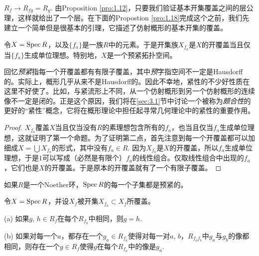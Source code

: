 $R_f\to R_{fg}=R_g$. 由Proposition \ref{pro:1.12}，只要我们验证基本开集覆盖之间的层公理，这样就给出了一个层。在下面的Propostion \ref{pro:1.18}完成这个之前，我们先建立一个简单但是很基本的引理，它描述了仿射概形的基本开集的覆盖。

\begin{lem}\label{lem:1.16}
	令$X=\operatorname{Spec} R$，以及$\{f_a\}$是一族$R$中的元素。于是开集族$X_{f_a}$是$X$的开覆盖当且仅当$\{f_a\}$生成单位理想。特别地，$X$是一个预紧拓扑空间。
\end{lem}

回忆\textit{预紧}指每一个开覆盖都有有限子覆盖，其中\textit{预}字指空间不一定是Hausdorff的。实际上，概形几乎从来不是Hausdorff的。因此不幸地，紧性的不少好性质在这里不好使了。比如，与紧流形上不同，从一个仿射概形到另一个仿射概形的连续像不一定是闭的。正是这个原因，我们将在\ref{sec:3.1}节中讨论一个被称为\textit{颇合性}的更好的“紧性”概念，它将在概形理论中担任起寻常几何理论中的紧性的重要作用。

\begin{proof}
	$X_{f_a}$覆盖$X$当且仅当没有$R$的素理想包含所有的$f_a$，也当且仅当$f_a$生成单位理想，这就证明了第一个命题。为了证明第二点，首先注意到每一个开覆盖都可以加细成$X=\bigcup X_{f_a}$的形式，其中没有$f_a\in R$. 因为$X_{f_a}$是$X$的开覆盖，所以$f_a$生成单位理想，于是$1$可以写成（必然是有限个）$f_a$的线性组合。仅取线性组合中出现的$f_a$，它们也是$X$的开覆盖。于是原本的开覆盖就有了一个有限子覆盖。
\end{proof}

\begin{exe}
	如果$R$是一个Noether环，$\operatorname{Spec} R$的每一个子集都是预紧的。
\end{exe}

\begin{pro}\label{pro:1.18}
令$X=\operatorname{Spec} R$，并设$X_f$被开集$X_{f_a}\subset X_f$所覆盖。
\begin{compactitem}
\item[{\rm (a)}] 如果$g$, $h\in R_f$在每个$R_{f_a}$中相同，则$g=h$.
\item[{\rm (b)}] 如果对每一个$a$，都存在一个$g_a\in R_{f_a}$使得对每一对$a$, $b$，$R_{f_af_b}$中$g_a$与$g_b$的像都相同，则存在一个$g\in R_f$使得$g$在每个$R_{f_a}$中的像是$g_a$.
\end{compactitem}
\end{pro}

